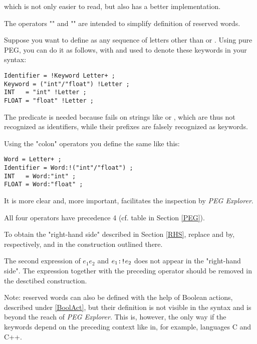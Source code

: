 which is not only easier to read, but also has a better implementation.

\medskip
The operators "\tx{:}" and "\tx{:!}" are intended to simplify definition of reserved words.

Suppose you want to define  as any sequence 
of letters other than  or .
Using pure PEG, you can do it as follows, 
with  and  used to denote these keywords in your syntax:

\small
\begin{Verbatim}[samepage=true,xleftmargin=15mm,xrightmargin=15mm,baselinestretch=0.8]
Identifier = !Keyword Letter+ ;
Keyword = ("int"/"float") !Letter ;
INT   = "int" !Letter ;
FLOAT = "float" !Letter ;
\end{Verbatim}
\normalsize

The predicate  is needed because
 fails on strings like  or ,
which are thus not recognized as identifiers,
while their prefixes are falsely recognized as keywords.

Using the "colon" operators you define the same like this:

\small
\begin{Verbatim}[samepage=true,xleftmargin=15mm,xrightmargin=15mm,baselinestretch=0.8]
Word = Letter+ ;
Identifier = Word:!("int"/"float") ;
INT   = Word:"int" ;
FLOAT = Word:"float" ;
\end{Verbatim}
\normalsize

It is more clear and, more important, facilitates the inspection by \textsl{PEG Explorer}.

\medskip
All four operators have precedence 4 (cf. table in Section \ref{PEG}).

To obtain the "right-hand side" described in Section \ref{RHS},
replace \tx{*+} and \tx{++} by, respectively, \tx{*} and \tx{+} 
in the construction outlined there.

The second expression of  $e_1$\tx{:}$e_2$ and $e_1\texttt{:!}e_2$ does not appear in the "right-hand side".
The expression together with the preceding operator should be removed in the desctibed construction.

Note: reserved words can also be defined with the help of Boolean actions, described under \ref{BoolAct}, 
but their definition is not visible in the syntax and is beyond the reach of \textsl{PEG Explorer}.
This is, however, the only way if the keywords depend on the preceding context like in,
for example, languages C and C++.

